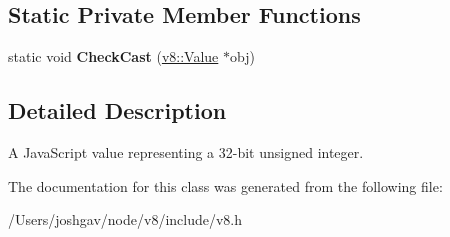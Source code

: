 \subsection*{Static Private Member Functions}
\begin{DoxyCompactItemize}
\item 
static void {\bfseries Check\+Cast} (\hyperlink{classv8_1_1_value}{v8\+::\+Value} $\ast$obj)\hypertarget{classv8_1_1_uint32_a2f0142e60929e6d48955bd48ec783d3d}{}\label{classv8_1_1_uint32_a2f0142e60929e6d48955bd48ec783d3d}

\end{DoxyCompactItemize}


\subsection{Detailed Description}
A Java\+Script value representing a 32-\/bit unsigned integer. 

The documentation for this class was generated from the following file\+:\begin{DoxyCompactItemize}
\item 
/\+Users/joshgav/node/v8/include/v8.\+h\end{DoxyCompactItemize}
